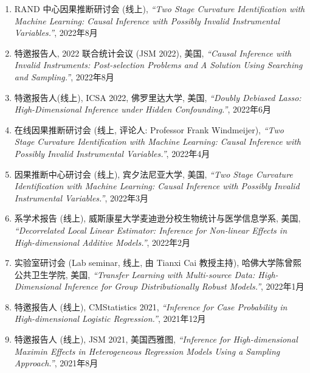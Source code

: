 \documentclass[margin, line]{res}
\begin{document}
\begin{resume}
\begin{enumerate}
            \item RAND 中心因果推断研讨会 (线上), 
                {\it ``Two Stage Curvature Identification with Machine Learning: Causal Inference with Possibly Invalid Instrumental Variables.''}, 
                2022年8月

            \item 特邀报告人, 2022 联合统计会议 (JSM 2022), 美国, 
                {\it ``Causal Inference with Invalid Instruments: Post-selection Problems and A Solution Using Searching and Sampling.''}, 
                2022年8月

            \item 特邀报告人(线上), ICSA 2022, 佛罗里达大学, 美国, {\it ``Doubly Debiased Lasso: High-Dimensional Inference under Hidden Confounding.''}, 
                2022年6月

            \item 在线因果推断研讨会 (线上, 评论人: Professor Frank Windmeijer), {\it ``Two Stage Curvature Identification with Machine Learning: Causal Inference with Possibly Invalid Instrumental Variables.''}, 
                2022年4月

            \item 因果推断中心研讨会 (线上), 宾夕法尼亚大学, 美国, 
                {\it ``Two Stage Curvature Identification with Machine Learning: Causal Inference with Possibly Invalid Instrumental Variables.''}, 
                2022年3月

            \item 系学术报告 (线上), 威斯康星大学麦迪逊分校生物统计与医学信息学系, 美国, {\it ``Decorrelated Local Linear Estimator: Inference for Non-linear Effects in High-dimensional Additive Models.''}, 
                2022年2月

            \item 实验室研讨会 (Lab seminar, 线上, 由 Tianxi Cai 教授主持), 哈佛大学陈曾熙公共卫生学院, 美国, {\it ``Transfer Learning with Multi-source Data: High-Dimensional Inference for Group Distributionally Robust Models.''}, 
                2022年1月

            \item 特邀报告人 (线上), CMStatistics 2021, {\it ``Inference for Case Probability in High-dimensional Logistic Regression.''}, 
                2021年12月

            \item 特邀报告人 (线上), JSM 2021, 美国西雅图, {\it ``Inference for High-dimensional Maximin Effects in Heterogeneous Regression Models Using a Sampling Approach.''}, 
                2021年8月


\end{enumerate}
\end{resume}
\end{document}
